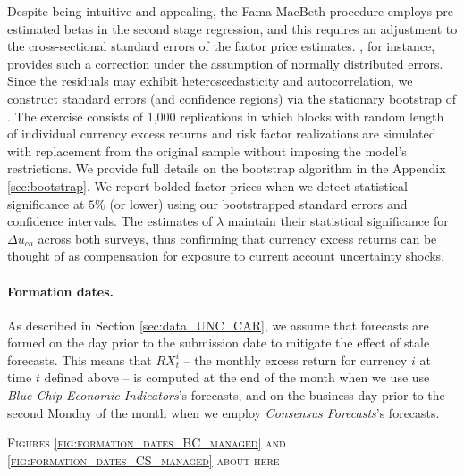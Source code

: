 Despite being intuitive and appealing, the Fama-MacBeth procedure employs pre-estimated betas in the second stage regression, and this requires an adjustment to the cross-sectional standard errors of the factor price estimates. \citet{shanken1992}, for instance, provides such a correction under the assumption of normally distributed errors. Since the residuals may exhibit heteroscedasticity and autocorrelation, we construct standard errors (and confidence regions) via the stationary bootstrap of \citet{politis/romano:94}. The exercise consists of 1,000 replications in which blocks with random length of individual currency excess returns and risk factor realizations are simulated with replacement from the original sample without imposing the model's restrictions. We provide full details on the bootstrap algorithm in the Appendix \ref{sec:bootstrap}. We report bolded factor prices when we detect statistical significance at $5\%$ (or lower) using our bootstrapped standard errors and confidence intervals. The estimates of $\lambda$ maintain their statistical significance for $\Delta u_{ca}$ across both surveys, thus confirming that currency excess returns can be thought of as compensation for exposure to current account uncertainty shocks. %

\paragraph{Formation dates.}
As described in Section \ref{sec:data_UNC_CAR}, we assume that forecasts are formed on the day prior to the submission date to mitigate the effect of stale forecasts. This means that $RX_{t}^{i}$ -- the monthly excess return for currency $i$ at time $t$ defined above -- is computed at the end of the month when we use use \emph{Blue Chip Economic Indicators}'s forecasts, and on the business day prior to the second Monday of the month when we employ \emph{Consensus Forecasts}'s forecasts.

\begin{center}
	\textsc{Figures \ref{fig:formation_dates_BC_managed} and \ref{fig:formation_dates_CS_managed} about here}
\end{center}

